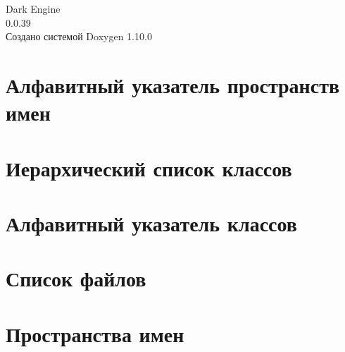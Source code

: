 \documentclass[twoside]{book}
\newcommand{\+}{\discretionary{\mbox{\scriptsize$\hookleftarrow$}}{}{}}
\newcommand{\clearemptydoublepage}{%
    \newpage{\pagestyle{empty}\cleardoublepage}%
  }
\begin{document}
  \raggedbottom
    \hypersetup{pageanchor=false,
                bookmarksnumbered=true,
                pdfencoding=unicode
               }
  \begin{titlepage}
  \vspace*{7cm}
  \begin{center}%
  {\Large Dark Engine}\\
  [1ex]\large 0.\+0.\+39 \\
  \vspace*{1cm}
  {\large Создано системой Doxygen 1.10.0}\\
  \end{center}
  \end{titlepage}
  \clearemptydoublepage
  \tableofcontents
  \clearemptydoublepage
  \hypersetup{pageanchor=true}
\chapter{Алфавитный указатель пространств имен}

\chapter{Иерархический список классов}

\chapter{Алфавитный указатель классов}

\chapter{Список файлов}

\chapter{Пространства имен}











\end{document}
